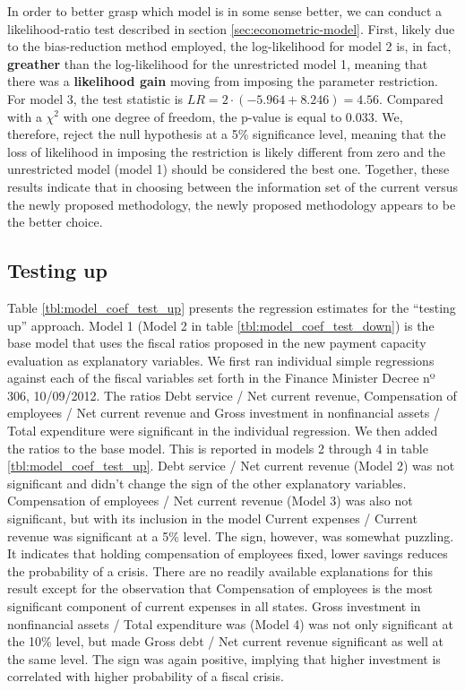 In order to better grasp which model is in some sense better, we can conduct a likelihood-ratio test described in section \ref{sec:econometric-model}. First, likely due to the bias-reduction method employed, the log-likelihood for model 2 is, in fact, \textbf{greather} than the log-likelihood for the unrestricted model 1, meaning that there was a \textbf{likelihood gain} moving from imposing the parameter restriction. For model 3, the test statistic is $LR = 2 \cdot (-5.964 + 8.246) = 4.56$. Compared with a $\chi^2$ with one degree of freedom, the p-value is equal to $0.033$. We, therefore, reject the null hypothesis at a 5\% significance level, meaning that the loss of likelihood in imposing the restriction is likely different from zero and the unrestricted model (model 1) should be considered the best one. Together, these results indicate that in choosing between the information set of the current versus the newly proposed methodology, the newly proposed methodology appears to be the better choice.



\clearpage

\subsection*{Testing up}

Table \ref{tbl:model_coef_test_up} presents the regression estimates for the ``testing up'' approach. Model 1 (Model 2 in table \ref{tbl:model_coef_test_down}) is the base model that uses the fiscal ratios proposed in the new payment capacity evaluation as explanatory variables. We first ran individual simple regressions against each of the fiscal variables set forth in the Finance Minister Decree nº 306, 10/09/2012. The ratios Debt service / Net current revenue, Compensation of employees / Net current revenue and Gross investment in nonfinancial assets / Total expenditure were significant in the individual regression. We then added the ratios to the base model. This is reported in models 2 through 4 in table \ref{tbl:model_coef_test_up}. Debt service / Net current revenue (Model 2) was not significant and didn't change the sign of the other explanatory variables. Compensation of employees / Net current revenue (Model 3) was also not significant, but with its inclusion in the model Current expenses / Current revenue was significant at a 5\% level. The sign, however, was somewhat puzzling. It indicates that holding compensation of employees fixed, lower savings reduces the probability of a crisis. There are no readily available explanations for this result except for the observation that Compensation of employees is the most significant component of current expenses in all states. Gross investment in nonfinancial assets / Total expenditure was (Model 4) was not only significant at the 10\% level, but made Gross debt / Net current revenue significant as well at the same level. The sign was again positive, implying that higher investment is correlated with higher probability of a fiscal crisis. 

